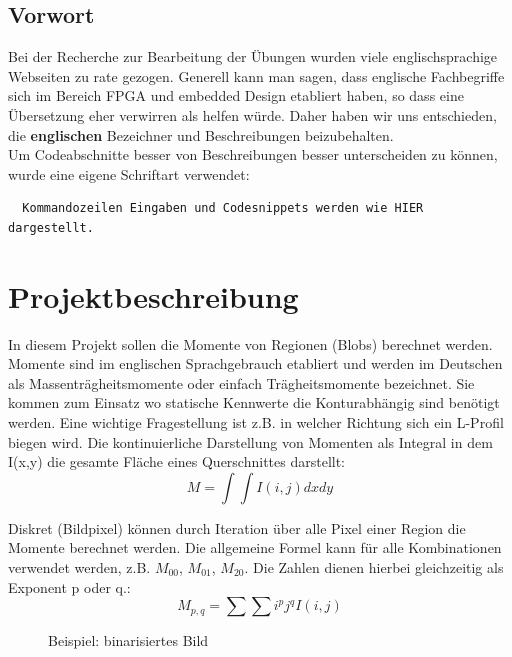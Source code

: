 \documentclass[a4paper]{report}
\begin{document}

\tableofcontents
\listoffigures




\section{Vorwort}
Bei der Recherche zur Bearbeitung der Übungen wurden viele englischsprachige Webseiten zu rate gezogen. Generell kann man sagen, dass englische Fachbegriffe sich im Bereich FPGA und embedded Design etabliert haben, so dass eine Übersetzung eher verwirren als helfen würde. Daher haben wir uns entschieden, die \textbf{englischen} Bezeichner und Beschreibungen beizubehalten.\\
Um Codeabschnitte besser von Beschreibungen besser unterscheiden zu können, wurde eine eigene Schriftart verwendet:
\begin{verbatim}
  Kommandozeilen Eingaben und Codesnippets werden wie HIER dargestellt.
\end{verbatim}

\chapter{Projektbeschreibung}
\label{Projektbeschreibung}
In diesem Projekt sollen die Momente von Regionen (Blobs) berechnet werden. Momente sind im englischen Sprachgebrauch etabliert und werden im Deutschen als Massenträgheitsmomente oder einfach Trägheitsmomente bezeichnet. Sie kommen zum Einsatz wo statische Kennwerte die Konturabhängig sind benötigt werden. Eine wichtige Fragestellung ist z.B. in welcher Richtung sich ein L-Profil biegen wird. Die kontinuierliche Darstellung von Momenten als Integral in dem I(x,y) die gesamte Fläche eines Querschnittes darstellt: $$M = \int \int I(i,j) dxdy$$

Diskret (Bildpixel) können durch Iteration über alle Pixel einer Region die Momente berechnet werden. Die allgemeine Formel kann für alle Kombinationen verwendet werden, z.B. $M_{00}$, $M_{01}$, $M_{20}$. Die Zahlen dienen hierbei gleichzeitig als Exponent p oder q.: $$M_{p,q} = \sum \sum i^p j^q I(i,j)$$

	\begin{figure}[H]
	\centering
	\caption{Beispiel: binarisiertes Bild}
	\label{Entwurf des Projects}
	\end{figure}
\end{document}
